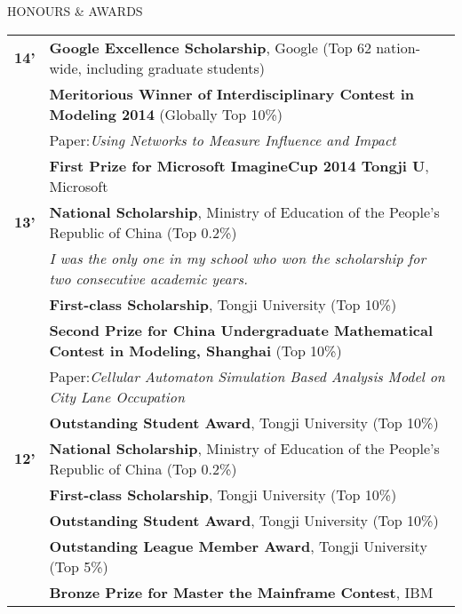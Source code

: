 \documentclass{resume} %
\begin{document}
\begin{rSection}{HONOURS \& AWARDS}

  \begin{tabular}{ @{} >{\bfseries}l @{\hspace{3ex}} l }
    14' & {\bf Google Excellence Scholarship}, Google (Top 62 nation-wide, including graduate students)     \\
        & {\bf Meritorious Winner of Interdisciplinary Contest in Modeling 2014} (Globally Top 10\%)       \\
    & {\space\space\space\space Paper}:{\em \space Using Networks to Measure Influence and Impact}               \\
        & {\bf First Prize for Microsoft ImagineCup 2014 Tongji U}, Microsoft                               \\
    13' & {\bf National Scholarship}, Ministry of Education of the People’s Republic of China (Top 0.2\%)   \\
        & {\em \space\space\space\space I was the only one in my school who won the scholarship for two consecutive academic years.} \\
        & {\bf First-class Scholarship}, Tongji University (Top 10\%)                                       \\
        & {\bf Second Prize for China Undergraduate Mathematical Contest in Modeling, Shanghai} (Top 10\%) \\
    & {\space\space\space\space Paper}:{\em \space Cellular Automaton Simulation Based Analysis Model
  on City Lane Occupation}\\
        & {\bf Outstanding Student Award}, Tongji University (Top 10\%)                                     \\
    12' & {\bf National Scholarship}, Ministry of Education of the People’s Republic of China (Top 0.2\%)   \\
        & {\bf First-class Scholarship}, Tongji University (Top 10\%)                                       \\
        & {\bf Outstanding Student Award}, Tongji University (Top 10\%)                                     \\
        & {\bf Outstanding League Member Award}, Tongji University (Top 5\%)                                \\
        & {\bf Bronze Prize for Master the Mainframe Contest}, IBM                                          \\
  \end{tabular}

\end{rSection}
\end{document}
